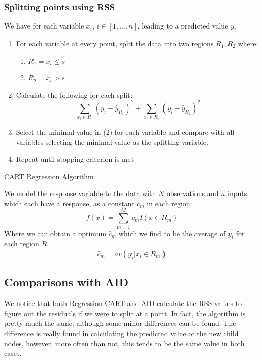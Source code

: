 \documentclass[11pt,a4paper]{report}
\begin{document}
\subsubsection{Splitting points using RSS}
We have for each variable $x_i$, $i \in [1, \dots, n]$, leading to a predicted value $y_i$ 
\begin{algorithm}
\begin{enumerate}
    \item For each variable at every point, split the data into two regions $R_1, R_2$ where:
    \begin{enumerate}
        \item $R_1 = x_i \leq s$
        \item $R_2 = x_i > s$
    \end{enumerate}
    
    \item Calculate the following for each split:
    \begin{equation}
     \sum_{x_i \in R_1} (y_i - \hat{y}_{R_1})^2  +  \sum_{x_i \in R_2} (y_i - \hat{y}_{R_2})^2
    \end{equation}
    
    \item Select the minimal value in (2) for each variable and compare with all variables selecting the minimal value as the splitting variable.
    
    \item Repeat until stopping criterion is met
\end{enumerate}
\caption{CART Regression Algorithm}
\end{algorithm}


We model the response variable to the data with $N$ observations and $n$ inputs, which each have a response, as a constant $c_m$ in each region:
\begin{equation}
    f(x) = \sum_{m=1}^{M} c_m I (x \in R_m)
\end{equation}
Where we can obtain a optimum $\hat{c}_m$ which we find to be the average of $y_i$ for each region $R$.
\begin{equation}
    \hat{c}_m = av(y_i | x_i \in R_m)
\end{equation}

\subsection{Comparisons with AID}
We notice that both Regression CART and AID calculate the RSS values to figure out the residuals if we were to split at a point.
In fact, the algorithm is pretty much the same, although some minor differences can be found. 
The difference is really found in calculating the predicted value of the new child nodes, however, more often than not, this tends to be the same value in both cases.
\end{document}
